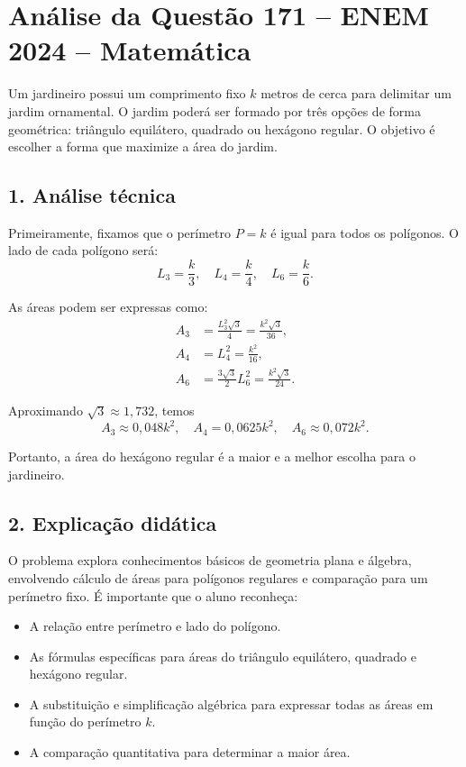 \documentclass{article}
\begin{document}
\section*{Análise da Questão 171 -- ENEM 2024 -- Matemática}

Um jardineiro possui um comprimento fixo \(k\) metros de cerca para delimitar um jardim ornamental. O jardim poderá ser formado por três opções de forma geométrica: triângulo equilátero, quadrado ou hexágono regular. O objetivo é escolher a forma que maximize a área do jardim.

\subsection*{1. Análise técnica}

Primeiramente, fixamos que o perímetro \(P = k\) é igual para todos os polígonos. O lado de cada polígono será:
\[
L_3 = \frac{k}{3}, \quad L_4 = \frac{k}{4}, \quad L_6 = \frac{k}{6}.
\]

\noindent As áreas podem ser expressas como:
\begin{align*}
A_3 &= \frac{L_3^2 \sqrt{3}}{4} = \frac{k^2 \sqrt{3}}{36}, \\
A_4 &= L_4^2 = \frac{k^2}{16}, \\
A_6 &= \frac{3 \sqrt{3}}{2} L_6^2 = \frac{k^2 \sqrt{3}}{24}.
\end{align*}

\noindent Aproximando \(\sqrt{3} \approx 1{,}732\), temos
\[
A_3 \approx 0{,}048k^2, \quad A_4 = 0{,}0625k^2, \quad A_6 \approx 0{,}072k^2.
\]

\noindent Portanto, a área do hexágono regular é a maior e a melhor escolha para o jardineiro.

\subsection*{2. Explicação didática}

O problema explora conhecimentos básicos de geometria plana e álgebra, envolvendo cálculo de áreas para polígonos regulares e comparação para um perímetro fixo. É importante que o aluno reconheça:
\begin{itemize}
  \item A relação entre perímetro e lado do polígono.
  \item As fórmulas específicas para áreas do triângulo equilátero, quadrado e hexágono regular.
  \item A substituição e simplificação algébrica para expressar todas as áreas em função do perímetro \(k\).
  \item A comparação quantitativa para determinar a maior área.
\end{itemize}
\end{document}
